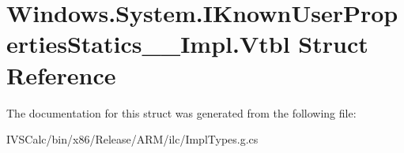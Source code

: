 \hypertarget{struct_windows_1_1_system_1_1_i_known_user_properties_statics_____impl_1_1_vtbl}{}\section{Windows.\+System.\+I\+Known\+User\+Properties\+Statics\+\_\+\+\_\+\+Impl.\+Vtbl Struct Reference}
\label{struct_windows_1_1_system_1_1_i_known_user_properties_statics_____impl_1_1_vtbl}


The documentation for this struct was generated from the following file\+:\begin{DoxyCompactItemize}
\item 
I\+V\+S\+Calc/bin/x86/\+Release/\+A\+R\+M/ilc/Impl\+Types.\+g.\+cs\end{DoxyCompactItemize}

